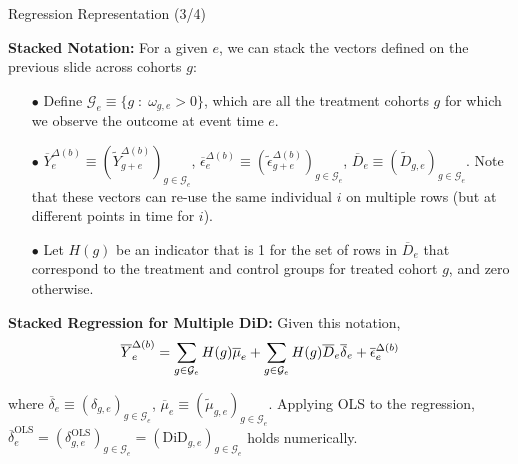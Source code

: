 \documentclass[usenames,dvipsnames]{beamer}
\begin{document}
\begin{frame}{Regression Representation (3/4)}
 
\textbf{Stacked Notation:}  For a given $e$, we can stack the vectors defined on the previous slide across cohorts $g$:
\vspace{-0.1cm}
\begin{itemize}
\item[$\bullet$] Define $\mathcal{G}_e \equiv \{g \; : \; \omega_{g,e} > 0\}$, which are all the treatment cohorts $g$ for which we observe the outcome at event time $e$.
\item[$\bullet$] $\overline{Y}^{\Delta(b)}_{e} \equiv (\tilde{Y}^{\Delta(b)}_{g+e})_{g \in \mathcal{G}_e}$, $\overline{\epsilon}^{\Delta(b)}_{e} \equiv (\tilde{\epsilon}^{\Delta(b)}_{g+e})_{g \in \mathcal{G}_e}$, $\overline{D}_{e} \equiv (\tilde{D}_{g,e})_{g \in \mathcal{G}_e}$. Note that these vectors can re-use the same individual $i$ on multiple rows (but at different points in time for $i$).
\item[$\bullet$] Let $H(g)$ be an indicator that is 1 for the set of rows in $\overline{D}_{e}$ that correspond to the treatment and control groups for treated cohort $g$, and zero otherwise.
\end{itemize} 

\textbf{Stacked Regression for Multiple DiD:}   Given this notation,  
\vspace{-0.15cm}
\begin{equation} \notag
\overline{Y}^{\Delta(b)}_{e} 
= 
\sum_{g \in \mathcal{G}_e} H(g) \overline{\mu}_{e} + 
\sum_{g \in \mathcal{G}_e} H(g) \overline{D}_{e} \overline{\delta}_{e} + 
\overline{\epsilon}^{\Delta(b)}_{e}
\end{equation}

\vspace{-0.5cm}
 
where $\overline{\delta}_{e} \equiv (\delta_{g,e})_{g \in \mathcal{G}_e}$, $\overline{\mu}_{e} \equiv (\tilde\mu_{g,e})_{g \in \mathcal{G}_e}$. Applying OLS to the regression, $\overline{\delta}^{\text{OLS}}_{e} = (\delta^{\text{OLS}}_{g,e} )_{g \in \mathcal{G}_e} = (\text{DiD}_{g,e})_{g \in \mathcal{G}_e}$ holds numerically. 


\end{frame}
\end{document}
